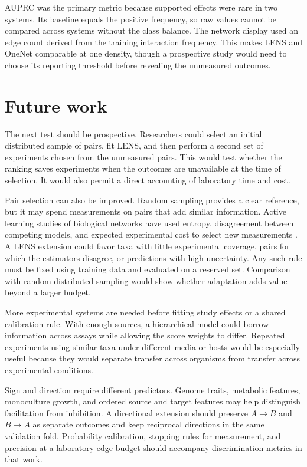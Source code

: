 \documentclass[11pt]{article}
\begin{document}
AUPRC was the primary metric because supported effects were rare in two systems.
Its baseline equals the positive frequency, so raw values cannot be compared across systems without the class balance.
The network display used an edge count derived from the training interaction frequency.
This makes LENS and OneNet comparable at one density, though a prospective study would need to choose its reporting threshold before revealing the unmeasured outcomes.

\section{Future work}

The next test should be prospective.
Researchers could select an initial distributed sample of pairs, fit LENS, and then perform a second set of experiments chosen from the unmeasured pairs.
This would test whether the ranking saves experiments when the outcomes are unavailable at the time of selection.
It would also permit a direct accounting of laboratory time and cost.

Pair selection can also be improved.
Random sampling provides a clear reference, but it may spend measurements on pairs that add similar information.
Active learning studies of biological networks have used entropy, disagreement between competing models, and expected experimental cost to select new measurements \citep{sverchkov2017active}.
A LENS extension could favor taxa with little experimental coverage, pairs for which the estimators disagree, or predictions with high uncertainty.
Any such rule must be fixed using training data and evaluated on a reserved set.
Comparison with random distributed sampling would show whether adaptation adds value beyond a larger budget.

More experimental systems are needed before fitting study effects or a shared calibration rule.
With enough sources, a hierarchical model could borrow information across assays while allowing the score weights to differ.
Repeated experiments using similar taxa under different media or hosts would be especially useful because they would separate transfer across organisms from transfer across experimental conditions.

Sign and direction require different predictors.
Genome traits, metabolic features, monoculture growth, and ordered source and target features may help distinguish facilitation from inhibition.
A directional extension should preserve $A\rightarrow B$ and $B\rightarrow A$ as separate outcomes and keep reciprocal directions in the same validation fold.
Probability calibration, stopping rules for measurement, and precision at a laboratory edge budget should accompany discrimination metrics in that work.
\end{document}

